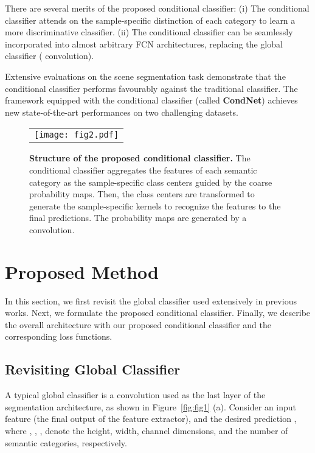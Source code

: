 \documentclass[journal]{IEEEtran}
\newcommand{\ra}[1]{\renewcommand{\arraystretch}{#1}}
\begin{document}
There are several merits of the proposed conditional classifier: 
(i) The conditional classifier attends on the sample-specific distinction of each category to learn a more discriminative classifier.
(ii) The conditional classifier can be seamlessly
incorporated into almost arbitrary FCN architectures, 
replacing the global classifier ( convolution).

Extensive evaluations on the scene segmentation task
demonstrate that 
the conditional classifier performs favourably against 
the traditional classifier. 
The framework equipped with 
the conditional classifier (called \textbf{CondNet})
achieves new state-of-the-art performances 
on two challenging datasets.




\begin{figure}[t]
\footnotesize
\centering
\renewcommand{\tabcolsep}{1pt} \ra{1} \begin{center}
\begin{tabular}{c}
\texttt{[image: fig2.pdf]} \\
\end{tabular}
\end{center}
\caption{\textbf{Structure of the proposed conditional classifier.}
The conditional classifier aggregates the features of each semantic category
as the sample-specific class centers 
guided by the coarse probability maps.
Then, the class centers are transformed to generate the sample-specific kernels
to recognize the features to the final predictions.
The probability maps are generated by a  convolution.}
\label{fig:structure}
\end{figure}




\section{Proposed Method}
\label{sec:method}
In this section,
we first revisit the global classifier used extensively in previous works.
Next,
we formulate the proposed conditional classifier.
Finally,
we describe the overall architecture with our proposed conditional classifier
and the corresponding loss functions.

\subsection{Revisiting Global Classifier}
A typical global classifier is 
a  convolution used as 
the last layer of the segmentation architecture,
as shown in Figure~\ref{fig:fig1} (a).
Consider an input feature  
(the final output of the feature extractor), 
and the desired prediction ,
where , , ,  denote the height, width, channel dimensions, and the number of semantic categories, respectively.
\end{document}
